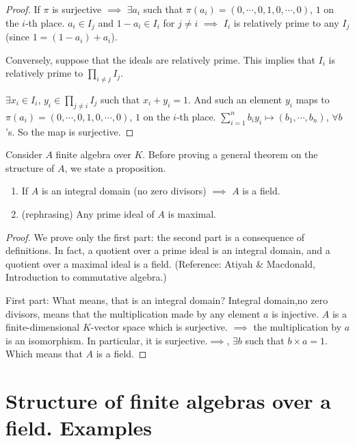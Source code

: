 \begin{proof}
If $\pi$ is surjective $\implies$ $\exists a_i$ such that $\pi(a_i)=(0,\cdots,0,1,0,\cdots,0)$, $1$ on the $i$-th place. $a_i\in I_j$ and $1-a_i\in I_i$ for $j\neq i$ $\implies$ $I_i$ is relatively prime to any $I_j$ (since $1 = (1-a_i) + a_i$).

Conversely, suppose that the ideals are relatively prime. This implies that $I_i$
is relatively prime to $\prod_{i\neq j} I_j$. 

$\exists x_i \in I_i$, $y_i \in \prod_{j\neq i} I_j$ such that $x_i + y_i = 1$. And such an element $y_i$ maps to $\pi(a_i)=(0,\cdots,0,1,0,\cdots,0)$, $1$ on the $i$-th place.
$\sum_{i=1}^n b_iy_i\mapsto(b_1,\cdots,b_n)$, $\forall b$'s. So the map is surjective.

\end{proof}

Consider $A$ finite algebra over $K$. Before proving a general theorem on the structure of $A$, we state a proposition. 

\begin{proposition}
\begin{enumerate}
\item If $A$ is an integral domain (no zero divisors) $\implies$ $A$ is a field.
\item (rephrasing) Any prime ideal of $A$ is maximal. 
\end{enumerate}
\end{proposition}

\begin{proof}
We prove only the first part: the second part is a consequence of definitions. In fact, a  quotient over a prime ideal is an integral domain, and a quotient over a maximal ideal is a field. (Reference: Atiyah  \& Macdonald, Introduction to commutative algebra.)

First part: What means, that is an integral domain? Integral domain,no zero divisors, means that the multiplication made by any element $a$ is injective. $A$ is a finite-dimensional $K$-vector space which is surjective. $\implies$ the multiplication by $a$ is an isomorphism. In particular, it is surjective.$\implies$, $\exists b$ such that $b \times a = 1$. Which means that $A$ is a field.
\end{proof}

\section{Structure of finite algebras over a field. Examples}

